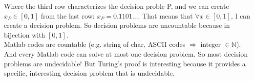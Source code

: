 Where the third row characterizes the decision proble P, and we can create $x_P \in [0,1]$ from the last row: $x_P = 0.1101...$. That means that $\forall x \in [0,1]$, I can create a decision problem. So decision problems are uncountable because in bijection with $[0,1]$.\\

Matlab codes are countable (e.g. string of char, ASCII codes $\Rightarrow$ integer $\in \mathbb{N}$). And every Matlab code can solve at most one decision problem. So most decision problems are undecidable! But Turing's proof is interesting because it provides a specific, interesting decision problem that is undecidable.